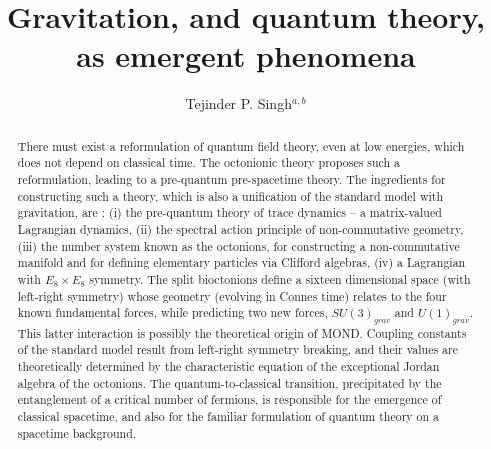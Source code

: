 \documentclass[a4paper]{jpconf}
\begin{document}
\title{Gravitation, and quantum theory, as emergent phenomena}

\author{Tejinder P. Singh$^{a,b}$}

\address{{}$^{a}$Inter-University Centre for Astronomy and Astrophysics, Post Bag 4, Ganeshkhind, Pune 411007, India \\
{}$^{b}$Tata Institute of Fundamental Research, Homi Bhabha Road, Mumbai 400005, India}


\begin{abstract}
There must exist a reformulation of quantum field theory, even at low energies, which does not depend on classical time. The octonionic theory proposes such a reformulation, leading to a pre-quantum pre-spacetime theory. The ingredients for constructing such a theory, which is also a unification of the standard model with gravitation, are : (i) the pre-quantum theory of trace dynamics – a matrix-valued Lagrangian dynamics, (ii) the spectral action principle of non-commutative geometry, (iii) the number system known as the octonions, for constructing a non-commutative manifold and for defining elementary particles via Clifford algebras, (iv) a Lagrangian with $E_8 \times E_8$ symmetry. The split bioctonions define a sixteen dimensional space (with left-right symmetry) whose geometry (evolving in Connes time) relates to the four known fundamental forces, while predicting two new forces, $SU(3)_{grav}$ and $U(1)_{grav}$. This latter interaction is possibly the theoretical origin of MOND. Coupling constants of the standard model result from left-right symmetry breaking, and their values are theoretically determined by the characteristic equation of the exceptional Jordan algebra of the octonions. The quantum-to-classical transition, precipitated by the entanglement of a critical number of fermions, is responsible for the emergence of classical spacetime, and also for the familiar formulation of quantum theory on a spacetime background.

\end{abstract}
\end{document}
